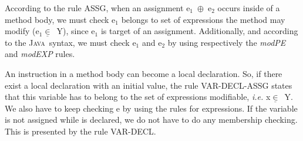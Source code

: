 \documentclass[a4paper]{llncs}
\newcommand{\java}{\textsc{Java}}
\begin{document}
According to the rule
\textup{ASSG}, when an assignment \textup{e}$_1$\ $\oplus$\
\textup{e}$_2$ occurs inside of a method body, we must check
\textup{e}$_1$ belongs to set of expressions the method may modify
(\textup{e}$_1\underline{\in}$\ \textsc{Y}), since \textup{e}$_1$ is
target of an assignment. Additionally, and according to the
\java~syntax, we must check \textup{e}$_1$ and \textup{e}$_2$ by
using respectively the \textit{modPE} and \textit{modEXP} rules.

An instruction in a method body can become a local declaration. So, if
there exist a local declaration with an initial value, the rule
\textup{VAR-DECL-ASSG} states that this variable has to belong to the
set
of expressions modifiable, \emph{i.e.} \textup{x}$\underline{\in}$\
\textsc{Y}. We also have to keep checking \textup{e} by using
the rules for expressions. If the
variable is not assigned while is declared, we do not have to do any
membership checking. This is presented by the rule \textup{VAR-DECL}.
\end{document}
